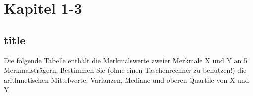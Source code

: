 \documentclass{scrartcl}
\begin{document}
\section{Kapitel 1-3}

\subsection{title}
Die folgende Tabelle enthält die Merkmalswerte zweier Merkmale X und Y an 5 Merkmalsträgern. Bestimmen Sie (ohne einen Taschenrechner zu benutzen!) die arithmetischen Mittelwerte, Varianzen, Mediane und oberen Quartile von X und Y.
\end{document}

